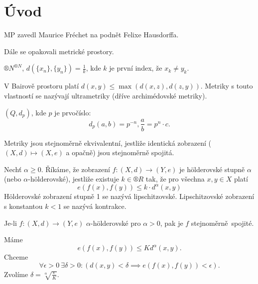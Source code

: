 \documentclass[12pt]{article}					%
\begin{document}
\section*{Úvod}
\begin{poznamka}[Historie]
	MP zavedl Maurice Fréchet na podnět Felixe Hausdorffa.
\end{poznamka}

\begin{poznamka}
	Dále se opakovali metrické prostory.
\end{poznamka}

\begin{definice}
	$®N^{®N}$, $d(\{x_n\}, \{y_n\}) = \frac{1}{k}$, kde $k$ je první index, že $x_k ≠ y_k$.
\end{definice}

\begin{poznamka}
	V Bairově prostoru platí $d(x, y) ≤ \max(d(x, z), d(z, y))$. Metriky s touto vlastností se nazývají ultrametriky (dříve archimédovské metriky).
\end{poznamka}

\begin{definice}
	$(Q, d_p)$, kde $p$ je prvočíslo:
	$$ d_p(a, b) = p^{-n}, \frac{a}{b} = p^n · c. $$
\end{definice}

\begin{definice}
	Metriky jsou stejnoměrně ekvivalentní, jestliže identická zobrazení ($(X, d) \mapsto (X, e)$ a opačně) jsou stejnoměrně spojitá.
\end{definice}

\begin{definice}
	Nechť $\alpha ≥ 0$. Říkáme, že zobrazení $f: (X, d) \rightarrow (Y, e)$ je hölderovské stupně $\alpha$ (nebo $\alpha$-hölderovské), jestliže existuje $k \in ®R$ tak, že pro všechna $x, y \in X$ platí
	$$ e(f(x), f(y)) ≤ k·d^\alpha(x, y) $$
	Hölderovské zobrazení stupně 1 se nazývá lipschitzovské. Lipschitzovské zobrazení s konstantou $k < 1$ se nazývá kontrakce.
\end{definice}


\begin{tvrzeni}
	Je-li $f: (X, d) \rightarrow (Y, e)$ $\alpha$-hölderovské pro $\alpha > 0$, pak je $f$ stejnoměrně spojité.

	\begin{dukazin}
		Máme
		$$ e(f(x), f(y)) ≤ K d^\alpha(x, y). $$
		Chceme
		$$ \forall \epsilon > 0\ \exists \delta > 0: (d(x, y) < \delta \implies e(f(x), f(y)) < \epsilon). $$
		Zvolíme $\delta = \sqrt[\alpha]{\frac{\epsilon}{K}}$.
	\end{dukazin}
\end{tvrzeni}
\end{document}
